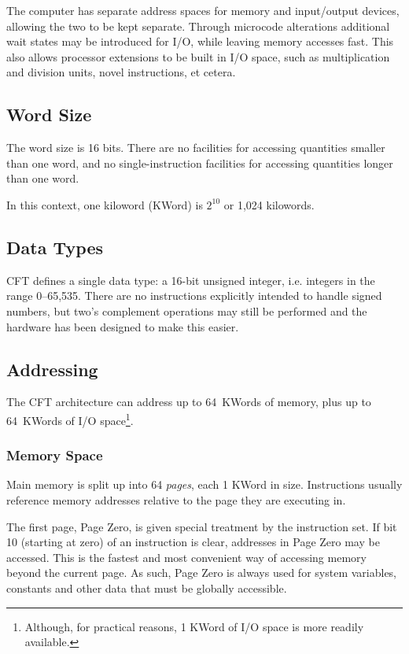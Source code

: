 \documentclass[11pt,a4paper,twocolumns]{article}
\begin{document}
The computer has separate address spaces for memory and input/output
devices, allowing the two to be kept separate. Through microcode
alterations additional wait states may be introduced for I/O, while
leaving memory accesses fast. This also allows processor extensions to
be built in I/O space, such as multiplication and division units,
novel instructions, et cetera.

\subsection{Word Size}

The word size is 16 bits. There are no facilities for accessing
quantities smaller than one word, and no single-instruction facilities
for accessing quantities longer than one word.

In this context, one kiloword (KWord) is $2^{10}$ or 1,024 kilowords.

\subsection{Data Types}

CFT defines a single data type: a 16-bit unsigned integer,
i.e. integers in the range 0–65,535. There are no instructions
explicitly intended to handle signed numbers, but two's complement
operations may still be performed and the hardware has been designed
to make this easier.

\subsection{Addressing}

The CFT architecture can address up to 64~KWords of memory, plus up to
64~KWords of I/O space\footnote{Although, for practical reasons, 1
  KWord of I/O space is more readily available.}.

\subsubsection{Memory Space}

Main memory is split up into 64 {\em pages\/}, each 1 KWord in
size. Instructions usually reference memory addresses relative to the
page they are executing in.

The first page, Page Zero, is given special treatment by the
instruction set. If bit 10 (starting at zero) of an instruction is
clear, addresses in Page Zero may be accessed. This is the fastest and
most convenient way of accessing memory beyond the current page. As
such, Page Zero is always used for system variables, constants and
other data that must be globally accessible.
\end{document}
